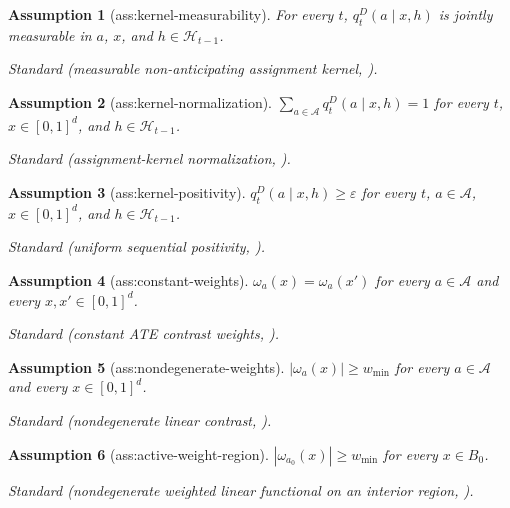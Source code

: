 \documentclass{article}
\newtheorem{assumption}{Assumption}
\begin{document}
\begin{assumption}[ass:kernel-measurability]\label{ass:kernel-measurability}
For every \(t\), \(q_t^D(a\mid x,h)\) is jointly measurable in \(a\), \(x\), and \(h\in\mathcal H_{t-1}\).
\par\smallskip\noindent\emph{Standard} (measurable non-anticipating assignment kernel, \cite{LiSimchiLevi2026SequentialEfficiency}).
\end{assumption}

\begin{assumption}[ass:kernel-normalization]\label{ass:kernel-normalization}
\(\sum_{a\in\mathcal A}q_t^D(a\mid x,h)=1\) for every \(t\), \(x\in[0,1]^d\), and \(h\in\mathcal H_{t-1}\).
\par\smallskip\noindent\emph{Standard} (assignment-kernel normalization, \cite{LiSimchiLevi2026SequentialEfficiency}).
\end{assumption}

\begin{assumption}[ass:kernel-positivity]\label{ass:kernel-positivity}
\(q_t^D(a\mid x,h)\ge\varepsilon\) for every \(t\), \(a\in\mathcal A\), \(x\in[0,1]^d\), and \(h\in\mathcal H_{t-1}\).
\par\smallskip\noindent\emph{Standard} (uniform sequential positivity, \cite{LiSimchiLevi2026SequentialEfficiency}).
\end{assumption}

\begin{assumption}[ass:constant-weights]\label{ass:constant-weights}
\(\omega_a(x)=\omega_a(x')\) for every \(a\in\mathcal A\) and every \(x,x'\in[0,1]^d\).
\par\smallskip\noindent\emph{Standard} (constant ATE contrast weights, \cite{LiSimchiLevi2026SequentialEfficiency}).
\end{assumption}

\begin{assumption}[ass:nondegenerate-weights]\label{ass:nondegenerate-weights}
\(|\omega_a(x)|\ge w_{\min}\) for every \(a\in\mathcal A\) and every \(x\in[0,1]^d\).
\par\smallskip\noindent\emph{Standard} (nondegenerate linear contrast, \cite{LiSimchiLevi2026SequentialEfficiency}).
\end{assumption}

\begin{assumption}[ass:active-weight-region]\label{ass:active-weight-region}
\(|\omega_{a_0}(x)|\ge w_{\min}\) for every \(x\in B_0\).
\par\smallskip\noindent\emph{Standard} (nondegenerate weighted linear functional on an interior region, \cite{LiSimchiLevi2026SequentialEfficiency}).
\end{assumption}
\end{document}
